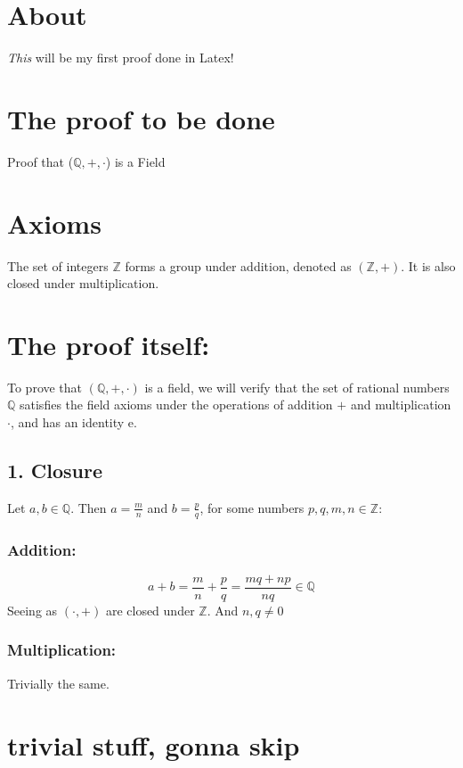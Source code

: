\documentclass{article}
\begin{document}
\section{About}
\textit{This} will be my first proof done in Latex!


\section{The proof to be done}

Proof that ($\mathbb{Q}, +, \cdot$) is a Field 

\section{Axioms}

The set of integers \(\mathbb{Z}\) forms a group under addition, denoted as \((\mathbb{Z}, +)\). It is also closed under multiplication.

\section{The proof itself:}
To prove that \((\mathbb{Q}, +, \cdot)\) is a field, we will verify that the set of rational numbers \(\mathbb{Q}\) satisfies the field axioms under the operations of addition \(+\) and multiplication \(\cdot\), and has an identity e.

\subsection*{1. Closure}

Let $a, b \in \mathbb{Q}$. Then $a = \frac{m}{n}$ and $b = \frac{p}{q}$, for some numbers $p,q,m,n\in\mathbb{Z}$:

\subsubsection*{Addition: }
\[
a + b = \frac{m}{n} + \frac{p}{q} = \frac{mq + np}{nq} \in \mathbb{Q}
\]
Seeing as $(\cdot,+)$ are closed under $\mathbb{Z}$. And $n,q \neq0$

\subsubsection*{Multiplication: }

Trivially the same.

\section{trivial stuff, gonna skip }
\end{document}
